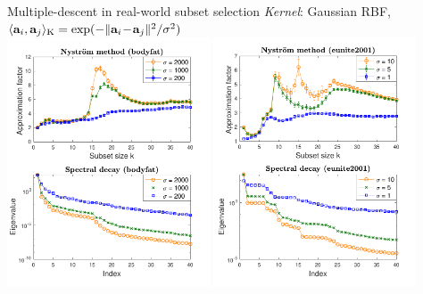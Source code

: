 \documentclass{beamer}
\begin{document}
\begin{frame}
\begin{columns}
\begin{column}{.32\textwidth}
  \begin{block}{Multiple-descent in real-world subset selection}
  \emph{Kernel}: Gaussian RBF,
  $\langle\mathbf a_i,\mathbf a_j\rangle_\text{K}=\exp(-\|\mathbf a_i\!-\!\mathbf a_j\|^2/\sigma^2)$\\[3mm]
  
  \centering
  \includegraphics[width=0.45\textwidth]{../figs/nystrom/rbf-bodyfat-double}
  \hspace{5mm}
  \includegraphics[width=0.45\textwidth]{../figs/nystrom/rbf-eunite2001-double}
  
\end{block}

\end{column}
\end{columns}
\vspace{1cm}


  

\end{frame}
\end{document}
